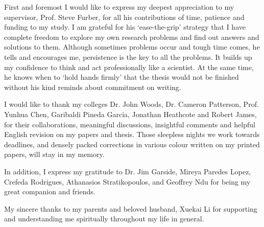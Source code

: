 First and foremost I would like to express my deepest appreciation to my supervisor, Prof. Steve Furber, for all his contributions of time, patience and funding to my study.
I am grateful for his `ease-the-grip' strategy that I have complete freedom to explore my own research problems and find out answers and solutions to them.
Although sometimes problems occur and tough time comes, he tells and encourages me, persistence is the key to all the problems.
It builds up my confidence to think and act professionally like a scientist.
At the same time, he knows when to `hold hands firmly' that the thesis would not be finished without his kind reminds about commitment on writing.

I would like to thank my colleges Dr. John Woods, Dr. Cameron Patterson, Prof. Yunhua Chen, Garibaldi Pineda Garcia, Jonathan Heathcote and Robert James, for their collaborations, meaningful discussions, insightful comments and helpful English revision on my papers and thesis.
Those sleepless nights we work towards deadlines, and densely packed corrections in various colour written on my printed papers, will stay in my memory.

In addition, I express my gratitude to Dr. Jim Garside, Mireya Paredes Lopez, Crefeda Rodrigues, Athanasios Stratikopoulos, and Geoffrey Ndu for being my great companion and friends.

My sincere thanks to my parents and beloved husband, Xuekai Li for supporting and understanding me spiritually throughout my life in general.
 
 	